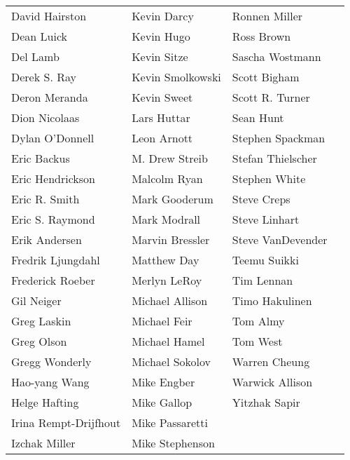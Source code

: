\begin{center}
\begin{tabular}{llll}
David Hairston & Kevin Darcy & Ronnen Miller\\
Dean Luick & Kevin Hugo & Ross Brown\\
Del Lamb & Kevin Sitze & Sascha Wostmann\\
Derek S. Ray & Kevin Smolkowski & Scott Bigham\\
Deron Meranda & Kevin Sweet & Scott R. Turner\\
Dion Nicolaas & Lars Huttar & Sean Hunt\\
Dylan O'Donnell & Leon Arnott & Stephen Spackman\\
Eric Backus & M. Drew Streib & Stefan Thielscher\\
Eric Hendrickson & Malcolm Ryan & Stephen White\\
Eric R. Smith & Mark Gooderum & Steve Creps\\
Eric S. Raymond & Mark Modrall & Steve Linhart\\
Erik Andersen & Marvin Bressler & Steve VanDevender\\
Fredrik Ljungdahl & Matthew Day & Teemu Suikki\\
Frederick Roeber & Merlyn LeRoy & Tim Lennan\\
Gil Neiger & Michael Allison & Timo Hakulinen\\
Greg Laskin & Michael Feir & Tom Almy\\
Greg Olson & Michael Hamel & Tom West\\
Gregg Wonderly & Michael Sokolov & Warren Cheung\\
Hao-yang Wang & Mike Engber & Warwick Allison\\
Helge Hafting & Mike Gallop & Yitzhak Sapir\\
Irina Rempt-Drijfhout & Mike Passaretti\\
Izchak Miller & Mike Stephenson
\end{tabular}
\end{center}
\clearpage


